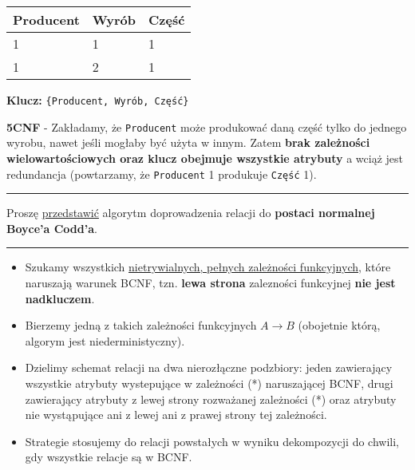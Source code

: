 \documentclass[a5paper,6pt]{article}
\newcommand{\horrule}[1]{\rule{\linewidth}{#1}}
\begin{document}
    \vskip 0.5cm

    \begin{center}
    \begin{tabular}{|l|l|l|}
        \hline
        \textbf{Producent} &
        \textbf{Wyrób} &
        \textbf{Część}\\
        \hline
        1 & 1 & 1 \\
        \hline
        1 & 2 & 1 \\
        \hline
        \end{tabular}
    \end{center}

    \vskip 0.5cm

    \textbf{Klucz:} \texttt{\{Producent, Wyrób, Część\}}\\

    \begin{tcolorbox}
    \textbf{5CNF} - Zakładamy, że \texttt{Producent} może produkować daną część
    tylko do jednego wyrobu, nawet jeśli mogłaby być użyta w innym. Zatem
    \textbf{brak zależności wielowartościowych oraz klucz obejmuje wszystkie
    atrybuty} a wciąż jest redundancja (powtarzamy, że \texttt{Producent} 1
    produkuje \texttt{Część} 1).
    \end{tcolorbox}

\pagebreak

    \horrule{0.5pt}
    Proszę \underline{przedstawić} algorytm doprowadzenia relacji do
    \textbf{postaci normalnej Boyce’a Codd’a}.\\
    \horrule{0.5pt}

    \begin{itemize}
        \item Szukamy wszystkich \underline{nietrywialnych, pełnych zależności
              funkcyjnych}, które naruszają warunek BCNF, tzn.
              \textbf{lewa strona} zalezności funkcyjnej
              \textbf{nie jest nadkluczem}.
        \item Bierzemy jedną z takich zależności funkcyjnych $A \rightarrow B$
              (obojetnie którą, algorym jest niederministyczny).
        \item Dzielimy schemat relacji na dwa nierozłączne podzbiory:
              jeden zawierający wszystkie atrybuty wystepujące w zależności (*)
              naruszającej BCNF,
              drugi zawierający atrybuty z lewej strony rozważanej zależności
              (*) oraz atrybuty nie wystąpujące ani z lewej ani z prawej strony
              tej zależności.
        \item Strategie stosujemy do relacji powstałych w wyniku dekompozycji
              do chwili, gdy wszystkie relacje są w BCNF.
    \end{itemize}
\end{document}
